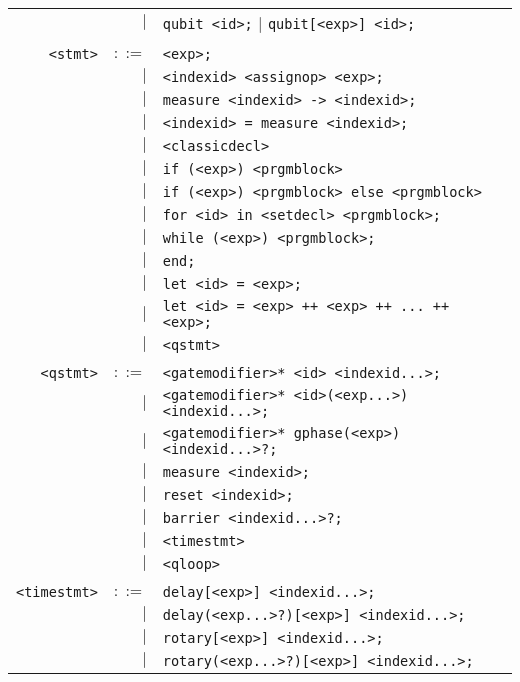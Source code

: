 \documentclass[notitlepage]{article}
\begin{document}
\begin{longtable}{rrl}
	    & $\mid$ & \texttt{qubit <id>;} $\mid$ \texttt{qubit[<exp>] <id>;} \\ \\
	\texttt{<stmt>} & $::=$ & \texttt{<exp>;} \\
	    & $\mid$ & \texttt{<indexid> <assignop> <exp>;} \\
	    & $\mid$ & \texttt{measure <indexid> -> <indexid>;} \\
	    & $\mid$ & \texttt{<indexid> = measure <indexid>;} \\
	    & $\mid$ & \texttt{<classicdecl>} \\
	    & $\mid$ & \texttt{if (<exp>) <prgmblock>} \\
	    & $\mid$ & \texttt{if (<exp>) <prgmblock> else <prgmblock>} \\
	    & $\mid$ & \texttt{for <id> in <setdecl> <prgmblock>;} \\
	    & $\mid$ & \texttt{while (<exp>) <prgmblock>;} \\
	    & $\mid$ & \texttt{end;} \\
	    & $\mid$ & \texttt{let <id> = <exp>;}\\
	    & $\mid$ & \texttt{let <id> = <exp> ++ <exp> ++ ... ++ <exp>;} \\
	    & $\mid$ & \texttt{<qstmt>} \\ \\
	\texttt{<qstmt>} & $::=$ & \texttt{<gatemodifier>* <id> <indexid...>;} \\
	    & $\mid$ & \texttt{<gatemodifier>* <id>(<exp...>) <indexid...>;} \\
	    & $\mid$ & \texttt{<gatemodifier>* gphase(<exp>) <indexid...>?;} \\
	    & $\mid$ & \texttt{measure <indexid>;} \\
	    & $\mid$ & \texttt{reset <indexid>;} \\
	    & $\mid$ & \texttt{barrier <indexid...>?;} \\
	    & $\mid$ & \texttt{<timestmt>} \\
	    & $\mid$ & \texttt{<qloop>} \\ \\
	\texttt{<timestmt>} & $::=$ & \texttt{delay[<exp>] <indexid...>;} \\
	    & $\mid$ & \texttt{delay(<exp...>?)[<exp>] <indexid...>;} \\
	    & $\mid$ & \texttt{rotary[<exp>] <indexid...>;} \\
	    & $\mid$ & \texttt{rotary(<exp...>?)[<exp>] <indexid...>;} \\

\end{longtable}
\end{document}
